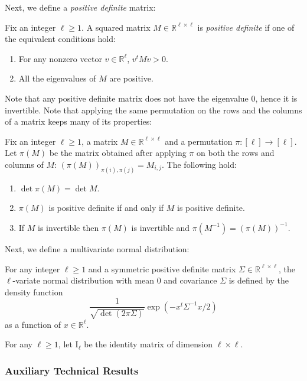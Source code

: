 \documentclass[final, 12pt]{colt2018}
\begin{document}
Next, we define a \emph{positive definite} matrix:
\begin{definition} \label{def:pd}
Fix an integer $\ell \ge 1$. A squared matrix $M \in \mathbb{R}^{\ell \times \ell}$ is \emph{positive definite} if one of the equivalent conditions hold:
\begin{enumerate}
\item For any nonzero vector $v \in \mathbb{R}^{\ell}$, $v^t M v > 0$.
\item All the eigenvalues of $M$ are positive.
\end{enumerate}
\end{definition}
Note that any positive definite matrix does not have the eigenvalue $0$, hence it is invertible.
Note that applying the same permutation on the rows and the columns of a matrix keeps many of its properties:
\begin{proposition}\label{prop:perm}
Fix an integer $\ell \ge 1$, a matrix $M \in \mathbb{R}^{\ell\times \ell}$ and a permutation $\pi \colon [\ell] \to [\ell]$. Let $\pi(M)$ be the matrix obtained after applying $\pi$ on both the rows and columns of $M$: $(\pi(M))_{\pi(i),\pi(j)} = M_{i,j}$. The following hold:
\begin{enumerate}
\item $\det \pi(M) = \det M$.
\item $\pi(M)$ is positive definite if and only if $M$ is positive definite.
\item If $M$ is invertible then $\pi(M)$ is invertible and $\pi(M^{-1}) = (\pi(M))^{-1}$.
\end{enumerate}
\end{proposition}

Next, we define a multivariate normal distribution:
\begin{definition}
For any integer $\ell \ge 1$ and a symmetric positive definite matrix $\Sigma \in \mathbb{R}^{\ell \times \ell}$, the $\ell$-variate normal distribution with mean $0$ and covariance $\Sigma$ is defined by the density function
\[
\frac{1}{\sqrt{\det(2 \pi\Sigma)}} \exp \left( -x^t \Sigma^{-1} x / 2\right)
\]
as a function of $x \in \mathbb{R}^\ell$.
\end{definition}

For any $\ell \ge 1$, let $\mathrm{I}_\ell$ be the identity matrix of dimension $\ell \times \ell$.

\subsubsection{Auxiliary Technical Results} \label{sec:gau-aux}
\end{document}
